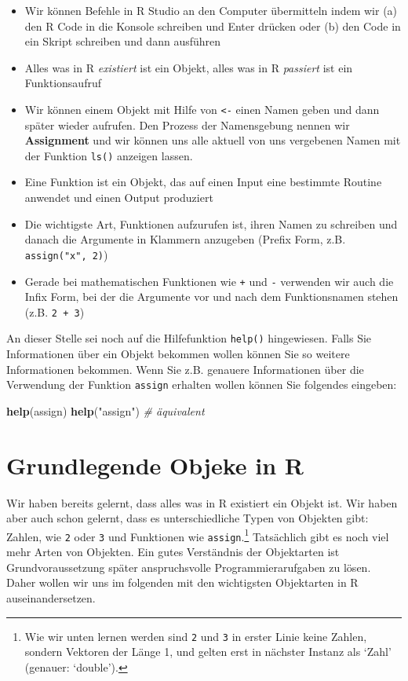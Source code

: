\documentclass[]{book}
\newenvironment{Shaded}{\begin{snugshade}}{\end{snugshade}}
\newcommand{\KeywordTok}[1]{\textcolor[rgb]{0.13,0.29,0.53}{\textbf{#1}}}
\newcommand{\StringTok}[1]{\textcolor[rgb]{0.31,0.60,0.02}{#1}}
\newcommand{\CommentTok}[1]{\textcolor[rgb]{0.56,0.35,0.01}{\textit{#1}}}
\newcommand{\NormalTok}[1]{#1}
\providecommand{\tightlist}{%
  \setlength{\itemsep}{0pt}\setlength{\parskip}{0pt}}
\let\rmarkdownfootnote\footnote%
\def\footnote{\protect\rmarkdownfootnote}
\begin{document}
\begin{itemize}
\tightlist
\item
  Wir können Befehle in R Studio an den Computer übermitteln indem wir
  (a) den R Code in die Konsole schreiben und Enter drücken oder (b) den
  Code in ein Skript schreiben und dann ausführen
\item
  Alles was in R \emph{existiert} ist ein Objekt, alles was in R
  \emph{passiert} ist ein Funktionsaufruf
\item
  Wir können einem Objekt mit Hilfe von \texttt{\textless{}-} einen
  Namen geben und dann später wieder aufrufen. Den Prozess der
  Namensgebung nennen wir \textbf{Assignment} und wir können uns alle
  aktuell von uns vergebenen Namen mit der Funktion \texttt{ls()}
  anzeigen lassen.
\item
  Eine Funktion ist ein Objekt, das auf einen Input eine bestimmte
  Routine anwendet und einen Output produziert
\item
  Die wichtigste Art, Funktionen aufzurufen ist, ihren Namen zu
  schreiben und danach die Argumente in Klammern anzugeben (Prefix Form,
  z.B. \texttt{assign("x",\ 2)})
\item
  Gerade bei mathematischen Funktionen wie \texttt{+} und \texttt{-}
  verwenden wir auch die Infix Form, bei der die Argumente vor und nach
  dem Funktionsnamen stehen (z.B. \texttt{2\ +\ 3})
\end{itemize}

An dieser Stelle sei noch auf die Hilfefunktion \texttt{help()}
hingewiesen. Falls Sie Informationen über ein Objekt bekommen wollen
können Sie so weitere Informationen bekommen. Wenn Sie z.B. genauere
Informationen über die Verwendung der Funktion \texttt{assign} erhalten
wollen können Sie folgendes eingeben:

\begin{Shaded}
\begin{Highlighting}[]
\KeywordTok{help}\NormalTok{(assign)}
\KeywordTok{help}\NormalTok{(}\StringTok{"assign"}\NormalTok{) }\CommentTok{# äquivalent}
\end{Highlighting}
\end{Shaded}

\section{Grundlegende Objeke in R}\label{grundlegende-objeke-in-r}

Wir haben bereits gelernt, dass alles was in R existiert ein Objekt ist.
Wir haben aber auch schon gelernt, dass es unterschiedliche Typen von
Objekten gibt: Zahlen, wie \texttt{2} oder \texttt{3} und Funktionen wie
\texttt{assign}.\footnote{Wie wir unten lernen werden sind \texttt{2}
  und \texttt{3} in erster Linie keine Zahlen, sondern Vektoren der
  Länge 1, und gelten erst in nächster Instanz als `Zahl' (genauer:
  `double').} Tatsächlich gibt es noch viel mehr Arten von Objekten. Ein
gutes Verständnis der Objektarten ist Grundvoraussetzung später
anspruchsvolle Programmierarufgaben zu lösen. Daher wollen wir uns im
folgenden mit den wichtigsten Objektarten in R auseinandersetzen.
\end{document}
